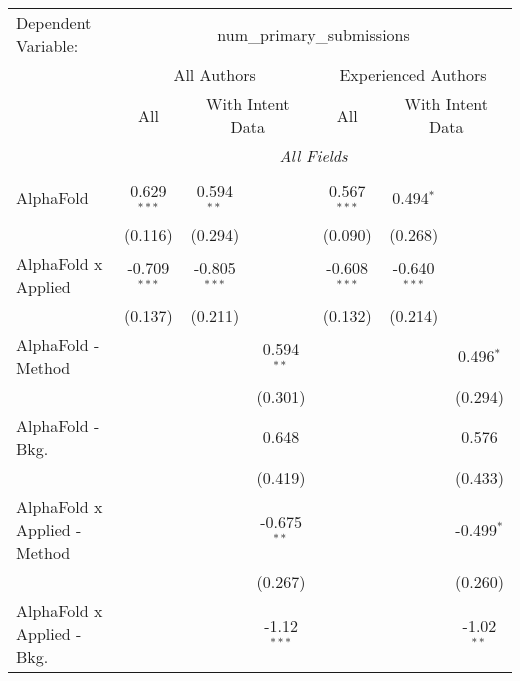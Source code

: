 \begingroup
\centering
\begin{tabular}{lcccccc}
   \tabularnewline \midrule \midrule
   Dependent Variable: & \multicolumn{6}{c}{num\_primary\_submissions}\\
 & \multicolumn{3}{c}{All Authors} & \multicolumn{3}{c}{Experienced Authors} \\
\cmidrule(lr){2-4} \cmidrule(lr){5-7}
 & \multicolumn{1}{c}{All} & \multicolumn{2}{c}{With Intent Data} & \multicolumn{1}{c}{All} & \multicolumn{2}{c}{With Intent Data} \\
\cmidrule(lr){2-2} \cmidrule(lr){3-4} \cmidrule(lr){5-5} \cmidrule(lr){6-7}
 & \multicolumn{6}{c}{\textit{All Fields}} \\ \\
   AlphaFold                      & 0.629$^{***}$  & 0.594$^{**}$   &               & 0.567$^{***}$  & 0.494$^{*}$    &   \\   
                                  & (0.116)        & (0.294)        &               & (0.090)        & (0.268)        &   \\   
   AlphaFold x Applied            & -0.709$^{***}$ & -0.805$^{***}$ &               & -0.608$^{***}$ & -0.640$^{***}$ &   \\   
                                  & (0.137)        & (0.211)        &               & (0.132)        & (0.214)        &   \\   
   AlphaFold - Method             &                &                & 0.594$^{**}$  &                &                & 0.496$^{*}$\\   
                                  &                &                & (0.301)       &                &                & (0.294)\\   
   AlphaFold - Bkg.               &                &                & 0.648         &                &                & 0.576\\   
                                  &                &                & (0.419)       &                &                & (0.433)\\   
   AlphaFold x Applied - Method   &                &                & -0.675$^{**}$ &                &                & -0.499$^{*}$\\   
                                  &                &                & (0.267)       &                &                & (0.260)\\   
   AlphaFold x Applied - Bkg.     &                &                & -1.12$^{***}$ &                &                & -1.02$^{**}$\\   

\end{tabular}
